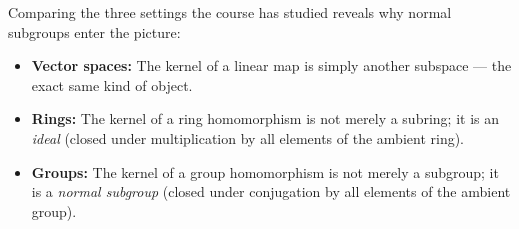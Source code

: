 \begin{content}
\end{content}

\begin{insight}
Comparing the three settings the course has studied reveals why normal subgroups enter the picture:
\begin{itemize}
    \item \textbf{Vector spaces:} The kernel of a linear map is simply another subspace --- the exact same kind of object.
    \item \textbf{Rings:} The kernel of a ring homomorphism is not merely a subring; it is an \emph{ideal} (closed under multiplication by all elements of the ambient ring).
    \item \textbf{Groups:} The kernel of a group homomorphism is not merely a subgroup; it is a \emph{normal subgroup} (closed under conjugation by all elements of the ambient group).
\end{itemize}
\end{insight}

